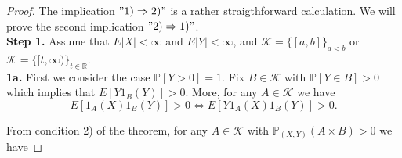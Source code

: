 \documentclass[sn-mathphys,Numbered,11pt]{sn-jnl}%
\theoremstyle{thmstyleone}%
\newcommand{\R}{\mathbb{R}}
\newcommand{\PP}{\mathbb{P}}
\newcommand{\KK}{\mathcal{K}}
\begin{document}
\begin{proof}
 The implication $"1) \Rightarrow 2)"$ is a rather straigthforward calculation. We will prove the second implication $"2)\Rightarrow 1)"$.\\
\textbf{Step 1.}  Assume  that $E|X|<\infty$ and $E|Y|<\infty$, and $\KK=\{[a,b]\}_{a<b}$ or $\KK=\{[t,\infty)\}_{t\in\R}$.\\
\textbf{1a.}  First we consider the case $\PP[Y>0]=1$. Fix $B\in\KK$ with  $\PP[Y\in B]>0$ which implies that $E[Y1_B(Y)]>0$. More, for any $A\in\KK$ we have  
$$E[1_A(X)1_B(Y)]>0\Leftrightarrow E[Y1_A(X)1_B(Y)]>0.$$

From condition 2) of the theorem, for any $A\in\KK$ with $\PP_{(X,Y)}(A\times B)>0$ we have


\end{proof}
\end{document}
